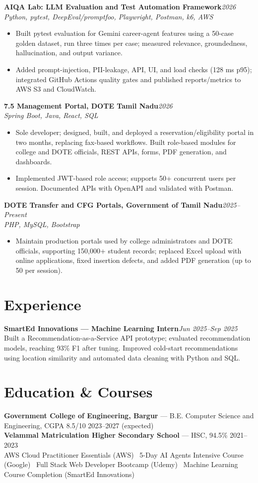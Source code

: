 \documentclass[10pt,a4paper]{extarticle}
\newcommand{\project}[2]{\textbf{#1}\hfill{\textit{#2}}\\[-2pt]}
\begin{document}
\project{AIQA Lab: LLM Evaluation and Test Automation Framework}{2026}
\textit{Python, pytest, DeepEval/promptfoo, Playwright, Postman, k6, AWS}
\begin{itemize}
  \item Built pytest evaluation for Gemini career-agent features using a 50-case golden dataset, run three times per case; measured relevance, groundedness, hallucination, and output variance.
  \item Added prompt-injection, PII-leakage, API, UI, and load checks (128 ms p95); integrated GitHub Actions quality gates and published reports/metrics to AWS S3 and CloudWatch.
\end{itemize}

\project{7.5 Management Portal, DOTE Tamil Nadu}{2026}
\textit{Spring Boot, Java, React, SQL}
\begin{itemize}
  \item Sole developer; designed, built, and deployed a reservation/eligibility portal in two months, replacing fax-based workflows. Built role-based modules for college and DOTE officials, REST APIs, forms, PDF generation, and dashboards.
  \item Implemented JWT-based role access; supports 50+ concurrent users per session. Documented APIs with OpenAPI and validated with Postman.
\end{itemize}

\project{DOTE Transfer and CFG Portals, Government of Tamil Nadu}{2025--Present}
\textit{PHP, MySQL, Bootstrap}
\begin{itemize}
  \item Maintain production portals used by college administrators and DOTE officials, supporting 150,000+ student records; replaced Excel upload with online applications, fixed insertion defects, and added PDF generation (up to 50 per session).
\end{itemize}

\section*{Experience}
\project{SmartEd Innovations --- Machine Learning Intern}{Jun 2025--Sep 2025}
Built a Recommendation-as-a-Service API prototype; evaluated recommendation models, reaching 93\% F1 after tuning. Improved cold-start recommendations using location similarity and automated data cleaning with Python and SQL.

\section*{Education \& Courses}
\textbf{Government College of Engineering, Bargur} --- B.E. Computer Science and Engineering, CGPA 8.5/10 \hfill 2023--2027 (expected)\\
\textbf{Velammal Matriculation Higher Secondary School} --- HSC, 94.5\% \hfill 2021--2023\\
AWS Cloud Practitioner Essentials (AWS) \textbar\ 5-Day AI Agents Intensive Course (Google) \textbar\ Full Stack Web Developer Bootcamp (Udemy) \textbar\ Machine Learning Course Completion (SmartEd Innovations)
\end{document}
